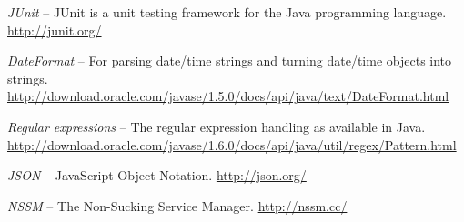 \begin{thebibliography}{999}
		\textit{JUnit} -- JUnit is a unit testing framework for the Java
		programming language. \\
		\url{http://junit.org/}{}
		
		\textit{DateFormat} -- For parsing date/time strings and turning date/time
		objects into strings.
		\url{http://download.oracle.com/javase/1.5.0/docs/api/java/text/DateFormat.html}{}
		
		\textit{Regular expressions} -- The regular expression handling as available
		in Java.
		\url{http://download.oracle.com/javase/1.6.0/docs/api/java/util/regex/Pattern.html}{}

		\textit{JSON} -- JavaScript Object Notation.
		\url{http://json.org/}{}

		\textit{NSSM} -- The Non-Sucking Service Manager.
		\url{http://nssm.cc/}{}

\end{thebibliography}
